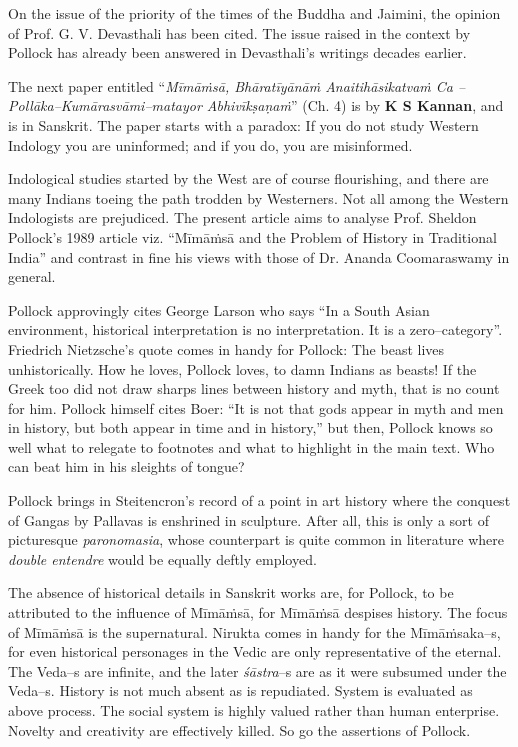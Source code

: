 On the issue of the priority of the times of the Buddha and Jaimini, the opinion of Prof. G. V. Devasthali has been cited. The issue raised in the context by Pollock has already been answered in Devasthali’s writings decades earlier. 

The next paper entitled “\textit{Mīmāṁsā, Bhāratīyānāṁ Anaitihāsikatvaṁ Ca – Pollāka–Kumārasvāmi–matayor Abhivīkṣaṇaṁ}” (Ch. 4) is by \textbf{K S Kannan}, and is in Sanskrit. The paper starts with a paradox: If you do not study Western Indology you are uninformed; and if you do, you are misinformed.

Indological studies started by the West are of course flourishing, and there are many Indians toeing the path trodden by Westerners. Not all among the Western Indologists are prejudiced. The present article aims to analyse Prof. Sheldon Pollock’s 1989 article viz. “Mīmāṁsā and the Problem of History in Traditional India” and contrast in fine his views with those of Dr. Ananda Coomaraswamy in general.

 Pollock approvingly cites George Larson who says “In a South Asian environment, historical interpretation is no interpretation. It is a zero–category”. Friedrich Nietzsche’s quote comes in handy for Pollock: The beast lives unhistorically. How he loves, Pollock loves, to damn Indians as beasts! If the Greek too did not draw sharps lines between history and myth, that is no count for him. Pollock himself cites Boer: “It is not that gods appear in myth and men in history, but both appear in time and in history,” but then, Pollock knows so well what to relegate to footnotes and what to highlight in the main text. Who can beat him in his sleights of tongue?

Pollock brings in Steitencron’s record of a point in art history where the conquest of Gangas by Pallavas is enshrined in sculpture. After all, this is only a sort of picturesque \textit{paronomasia}, whose counterpart is quite common in literature where \textit{double entendre} would be equally deftly employed. 

The absence of historical details in Sanskrit works are, for Pollock, to be attributed to the influence of Mīmāṁsā, for Mīmāṁsā despises history. The focus of Mīmāṁsā is the supernatural. Nirukta comes in handy for the Mīmāṁsaka–s, for even historical personages in the Vedic are only representative of the eternal. The Veda–s are infinite, and the later \textit{śāstra}–s are as it were subsumed under the Veda–s. History is not much absent as is repudiated. System is evaluated as above process. The social system is highly valued rather than human enterprise. Novelty and creativity are effectively killed. So go the assertions of Pollock.

